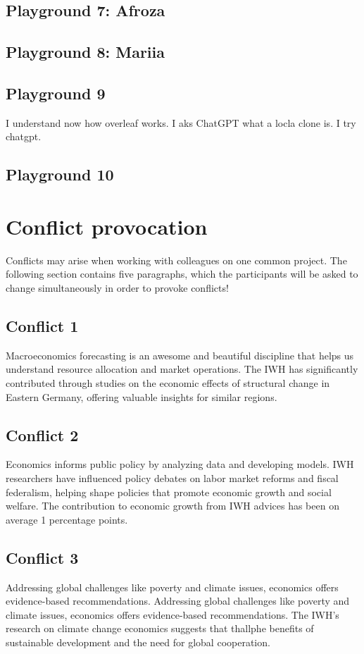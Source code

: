 \documentclass{article}
\begin{document}
\subsection{Playground 7: Afroza}

\subsection{Playground 8: Mariia}

\subsection{Playground 9}
I understand now how overleaf works.
I aks ChatGPT what a locla clone is. I try chatgpt.
\subsection{Playground 10}




\section{Conflict provocation}
Conflicts may arise when working with colleagues on one common project. The following section contains five paragraphs, which the participants will be asked to change simultaneously in order to provoke conflicts!

\subsection{Conflict 1}
Macroeconomics forecasting is an awesome and beautiful discipline that helps us understand resource allocation and market operations. The IWH has significantly contributed through studies on the economic effects of structural change in Eastern Germany, offering valuable insights for similar regions.

\subsection{Conflict 2}
Economics informs public policy by analyzing data and developing models. IWH researchers have influenced policy debates on labor market reforms and fiscal federalism, helping shape policies that promote economic growth and social welfare. The contribution to economic growth from IWH advices has been on average 1 percentage points.

\subsection{Conflict 3}
Addressing global challenges like poverty and climate issues, economics offers evidence-based recommendations. 
Addressing global challenges like poverty and climate issues, economics offers evidence-based recommendations. The IWH's research on climate change economics suggests that thallphe benefits of sustainable development and the need for global cooperation.
\end{document}
